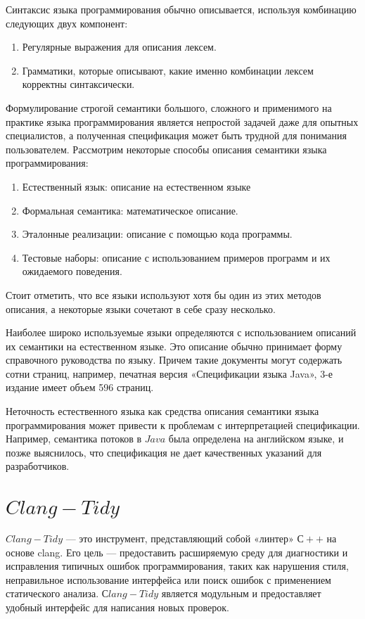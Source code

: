 \documentclass{mipt-thesis-bs}
\begin{document}
Синтаксис языка программирования обычно описывается, используя комбинацию следующих двух компонент:
\begin{enumerate}
    \item Регулярные выражения для описания лексем.
    \item Грамматики, которые описывают, какие именно комбинации лексем
    корректны синтаксически.
\end{enumerate}

Формулирование строгой семантики большого, сложного и применимого на практике языка 
программирования является непростой задачей даже для опытных специалистов, 
а полученная спецификация может быть трудной для понимания пользователем.
Рассмотрим некоторые способы описания семантики языка 
программирования:
\begin{enumerate}
    \item Естественный язык: описание на естественном языке
    \item Формальная семантика: математическое описание.
    \item Эталонные реализации: описание с помощью кода программы.
    \item Тестовые наборы: описание с использованием примеров программ
    и их ожидаемого поведения.
\end{enumerate}

Стоит отметить, что все языки используют хотя бы один из этих методов 
описания, а некоторые языки сочетают в себе сразу несколько.

Наиболее широко используемые языки определяются с использованием описаний 
их семантики на естественном языке. Это описание обычно принимает форму 
справочного руководства по языку. Причем такие документы могут содержать сотни 
страниц, например, печатная версия «Спецификации языка Java», 3-е издание имеет объем 596 страниц.

Неточность естественного языка как средства описания семантики 
языка программирования может привести к проблемам с интерпретацией 
спецификации. Например, семантика потоков в $Java$ была определена на 
английском языке, и позже выяснилось, что спецификация не дает 
качественных указаний для разработчиков.

\section{$Clang-Tidy$}

$Clang-Tidy$ — это инструмент, представляющий собой «линтер» $С++$ на основе clang.
Его цель — предоставить расширяемую среду для диагностики и 
исправления типичных ошибок 
программирования, таких как нарушения стиля, неправильное использование 
интерфейса или поиск ошибок с применением статического 
анализа. $Сlang-Tidy$ является модульным и предоставляет удобный 
интерфейс для написания новых проверок.
\end{document}
